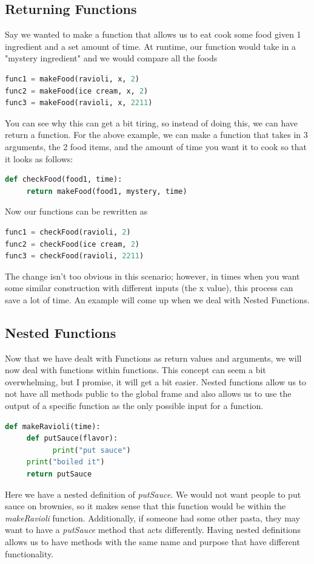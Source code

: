 \documentclass{article}
\begin{document}
\subsection{Returning Functions}
Say we wanted to make a function that allows us to eat cook some food given 1 ingredient and a set amount of time. At runtime, our function would take in a "mystery ingredient" and we would compare all the foods 
\begin{lstlisting}[language = Python]
func1 = makeFood(ravioli, x, 2)
func2 = makeFood(ice cream, x, 2)
func3 = makeFood(ravioli, x, 2211)
\end{lstlisting}
You can see why this can get a bit tiring, so instead of doing this, we can have return a function. For the above example, we can make a function that takes in 3 arguments, the 2 food items, and the amount of time you want it to cook so that it looks as follows: 
\begin{lstlisting}[language = Python]
def checkFood(food1, time):
     return makeFood(food1, mystery, time)
\end{lstlisting}
Now our functions can be rewritten as 
\begin{lstlisting}[language = Python]
func1 = checkFood(ravioli, 2)
func2 = checkFood(ice cream, 2)
func3 = checkFood(ravioli, 2211)
\end{lstlisting}
The change isn't too obvious in this scenario; however, in times when you want some similar construction with different inputs (the x value), this process can save a lot of time. An example will come up when we deal with Nested Functions.
\subsection{Nested Functions}
Now that we have dealt with Functions as return values and arguments, we will now deal with functions within functions. This concept can seem a bit overwhelming, but I promise, it will get a bit easier. Nested functions allow us to not have all methods public to the global frame and also allows us to use the output of a specific function as the only possible input for a function. 
\begin{lstlisting}[language = Python]
def makeRavioli(time):
     def putSauce(flavor):
           print("put sauce")
     print("boiled it")
     return putSauce
\end{lstlisting}
Here we have a nested definition of \emph{putSauce}. We would not want people to put sauce on brownies, so it makes sense that this function would be within the \emph{makeRavioli} function. Additionally, if someone had some other pasta, they may want to have a \emph{putSauce} method that acts differently. Having nested definitions allows us to have methods with the same name and purpose that have different functionality.
\end{document}
